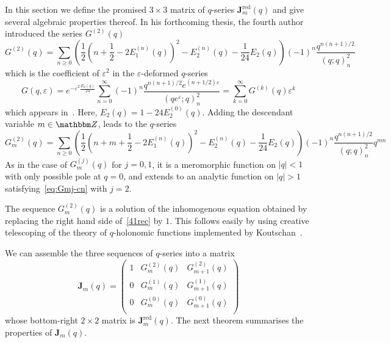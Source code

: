 \documentclass[12pt,reqno]{amsart}
\theoremstyle{definition}
\def\BZ{\mathbbm Z}
\def\be{\begin{equation}}
\def\ee{\end{equation}}
\def\ve{\varepsilon}
\def\bJ{\mathbf J}
\def\RED{\mathrm{red}}
\begin{document}
In this section we define the promised $3 \times 3$ matrix of $q$-series
$\bJ^\RED_{m}(q)$ and give several algebraic properties thereof. 
In his forthcoming thesis, the fourth author introduced the series $G^{(2)}(q)$
\be
\label{G2}
G^{(2)}(q) =
\sum_{n\geq0}\left(\frac{1}{2}\left(n+\frac{1}{2}-2E_{1}^{(n)}(q)\right)^2
  -E_{2}^{(n)}(q)
  -\frac{1}{24}E_{2}(q)\right)(-1)^{n}\frac{q^{n(n+1)/2}}{(q;q)_{n}^{2}}
\ee
which is the coefficient of $\ve^2$ in the $\ve$-deformed $q$-series
\be
\label{G41epsilon}
G(q,\ve)= e^{-\ve^{2}\frac{E_{2}(q)}{24}}
\sum_{n=0}^{\infty}(-1)^{n}\frac{q^{n(n+1)/2}e^{(n+1/2)\ve}}{(qe^{\ve};q)_{n}^{2}}
	= 
	\sum_{k=0}^{\infty}G^{(k)}(q)\ve^{k}
\ee
which appears in~\cite{GZ:qseries}. Here, $E_2(q)=1-24E_2^{(0)}(q)$.
Adding the descendant variable $m \in \BZ$, leads to the $q$-series
\be
\label{Gm2}
G_{m}^{(2)}(q) =
\sum_{n\geq0}\left(\frac{1}{2}\left(n+m+\frac{1}{2}-2E_{1}^{(n)}(q)\right)^2
  -E_{2}^{(n)}(q)
  -\frac{1}{24}E_{2}(q)\right)(-1)^{n}\frac{q^{n(n+1)/2}}{(q;q)_{n}^{2}}q^{mn}
\ee
As in the case of $G_{m}^{(j)}(q)$ for $j=0,1$, it is a meromorphic function on
$|q|<1$ with only possible pole at $q=0$, and extends to an analytic function on
$|q|>1$ satisfying~\eqref{eq:Gmj-cn} with $j=2$.

The sequence $G_{m}^{(2)}(q)$ is a solution of the inhomogenous
equation obtained by replacing the right hand side of~\eqref{41rec} by
$1$. This follows easily by using creative telescoping of the theory
of $q$-holonomic functions implemented by
Koutschan~\cite{Koutschan:holofunctions}.

We can assemble the three sequences of $q$-series into a matrix
\be
\label{Jq}
\bJ_{m}(q) =
\begin{pmatrix}
1 & G_{m}^{(2)}(q) & G_{m+1}^{(2)}(q)\\
0 & G_{m}^{(1)}(q) & G_{m+1}^{(1)}(q)\\
0 & G_{m}^{(0)}(q) & G_{m+1}^{(0)}(q)\\
\end{pmatrix} 
\ee
whose bottom-right $2 \times 2$ matrix is $\bJ^\RED_{m}(q)$. The next theorem summarises
the properties of $\bJ_{m}(q)$.
\end{document}
